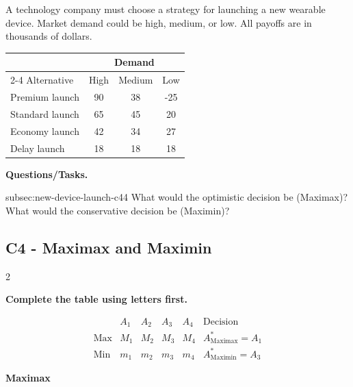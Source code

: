 	{
		A technology company must choose a strategy for launching a new wearable
		device. Market demand could be high, medium, or low. All payoffs are in
		thousands of dollars.
		
		\begin{center}
			\renewcommand{\arraystretch}{1.3}
			\small
			\begin{tabular}{lccc}
				\toprule
				& \multicolumn{3}{c}{Demand} \\
				\cmidrule(lr){2-4}
				Alternative & High & Medium & Low \\
				\midrule
				Premium launch & 90 & 38 & -25 \\
				Standard launch & 65 & 45 & 20 \\
				Economy launch & 42 & 34 & 27 \\
				Delay launch & 18 & 18 & 18 \\
				\bottomrule
			\end{tabular}
		\end{center}
		\vspace{-5mm}
		
		\textbf{Questions/Tasks.}
		\begin{enumerate}
			\CriterionTask
			{subsec:new-device-launch-c4}{4}
			{What would the optimistic decision be (Maximax)? What would the conservative decision be (Maximin)? }
		\end{enumerate}
		
		\label{subsec:new-device-launch-c4}
		\subsection*{C4 - Maximax and Maximin }
		
		
		\begin{multicols}{2}
			
			\textbf{Complete the table using letters first.}
			
			\[
			\begin{array}{c|ccccc}
				& A_1 & A_2 & A_3 & A_4 & \text{Decision}\\
				\hline
				\text{Max} &
				M_1 & M_2 & M_3 & M_4 &
				A^*_{\mathrm{Maximax}}=A_1
				\\
				\text{Min} &
				m_1 & m_2 & m_3 & m_4 &
				A^*_{\mathrm{Maximin}}=A_3
			\end{array}
			\]
			
			\textbf{Maximax}
			

\end{multicols}}

